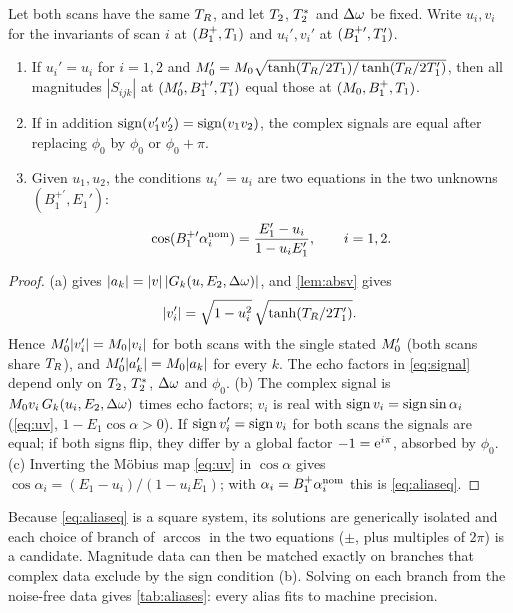 \begin{proposition}\label{prop:equiv}
Let both scans have the same $T_R$, and let $T_2$, $T_2^{*}$ and $\Delta\omega$ be fixed. Write
$u_i,v_i$ for the invariants of scan $i$ at $(B_1^{+},T_1)$ and $u_i',v_i'$ at $(B_1^{+\prime},T_1')$.
\begin{enumerate}
\item[(a)] If $u_i'=u_i$ for $i=1,2$ and $M_0'=M_0\sqrt{\tanh(T_R/2T_1)/\tanh(T_R/2T_1')}$, then all
  magnitudes $|S_{ijk}|$ at $(M_0',B_1^{+\prime},T_1')$ equal those at $(M_0,B_1^{+},T_1)$.
\item[(b)] If in addition $\operatorname{sign}(v_1'v_2')=\operatorname{sign}(v_1v_2)$, the complex signals are equal after
  replacing $\phi_0$ by $\phi_0$ or $\phi_0+\pi$.
\item[(c)] Given $u_1,u_2$, the conditions $u_i'=u_i$ are two equations in the two unknowns
  $(B_1^{+\prime},E_1')$:
  \begin{equation}
    \cos(B_1^{+\prime}\alpha_i^{\rm nom})=\frac{E_1'-u_i}{1-u_iE_1'},\qquad i=1,2.
    \label{eq:aliaseq}
  \end{equation}
\end{enumerate}
\end{proposition}
\begin{proof}
(a)  gives $|a_k|=|v|\,|G_k(u,E_2,\Delta\omega)|$, and \cref{lem:absv} gives
\[
  |v_i'|=\sqrt{1-u_i^2}\,\sqrt{\tanh(T_R/2T_1')} .
\]
Hence $M_0'|v_i'|=M_0|v_i|$ for both scans with the
single stated $M_0'$ (both scans share $T_R$), and $M_0'|a_k'|=M_0|a_k|$ for every $k$. The echo
factors in \eqref{eq:signal} depend only on $T_2$, $T_2^{*}$, $\Delta\omega$ and $\phi_0$. (b) The complex
signal is $M_0 v_i\,G_k(u_i,E_2,\Delta\omega)$ times echo factors; $v_i$ is real with
$\operatorname{sign} v_i=\operatorname{sign}\sin\alpha_i$ (\eqref{eq:uv}, $1-E_1\cos\alpha>0$). If $\operatorname{sign} v_i'=\operatorname{sign} v_i$ for both scans
the signals are equal; if both signs flip, they differ by a global factor $-1=\mathrm{e}^{i\pi}$,
absorbed by $\phi_0$. (c) Inverting the M\"obius map \eqref{eq:uv} in $\cos\alpha$ gives
$\cos\alpha_i=(E_1-u_i)/(1-u_iE_1)$; with $\alpha_i=B_1^{+}\alpha_i^{\rm nom}$ this is \eqref{eq:aliaseq}.
\end{proof}

Because \eqref{eq:aliaseq} is a square system, its solutions are generically isolated and
each choice of branch of $\arccos$ in the two equations ($\pm$, plus multiples of $2\pi$) is a
candidate. Magnitude data can then be matched exactly on branches that complex data exclude
by the sign condition (b). Solving on each branch from the noise-free data gives
\cref{tab:aliases}: every alias fits to machine precision.

